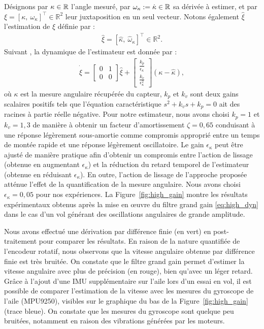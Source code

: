 Désignons par $\kappa \in {\mathbb R}$ l'angle mesuré, par $\omega_{\kappa} := \dot \kappa  \in {\mathbb R}$ sa dérivée à estimer, et par $\xi = [\kappa,~\omega_{\kappa}]^\top \in \mathbb{R}^2$ leur juxtaposition en un seul vecteur. Notons également $\hat{\xi}$ l'estimation de $\xi$ définie par :
\begin{align*}
    \hat{\xi} = [\hat{\kappa},~\hat{\omega}_{\kappa}]^\top \in \mathbb{R}^2.
\end{align*}
Suivant \cite{203613}, la dynamique de l'estimateur est donnée par :
\begin{align}
\label{eq:high_dyn}
    \dot{\hat{\xi}} =  \begin{bmatrix}0 & 1 \\ 0 & 0 \end{bmatrix} \hat{\xi}+ \begin{bmatrix}\frac{k_{p}}{\epsilon_{\kappa}}  \\ \frac{k_{v}}{\epsilon_{\kappa}^{2}}  \end{bmatrix} (\kappa - \hat{\kappa}),
\end{align}
où $\kappa$ est la mesure angulaire récupérée du capteur, $k_{p}$ et $k_{v}$ sont deux gains scalaires positifs tels que l'équation caractéristique $s^{2} + k_{v} s + k_{p} = 0$ ait des racines à partie réelle négative. Pour notre estimateur, nous avons choisi $k_{p} = 1$ et $k_{v} = 1,3$ de manière à obtenir un facteur d'amortissement $\zeta = 0,65$ conduisant à une réponse légèrement sous-amortie comme compromis approprié entre un temps de montée rapide et une réponse légèrement oscillatoire. Le gain $\epsilon_{\kappa}$ peut être ajusté de manière pratique afin d'obtenir un compromis entre l'action de lissage (obtenue en augmentant $\epsilon_{\kappa}$) et la réduction du retard temporel
de l'estimateur (obtenue en réduisant $\epsilon_{\kappa}$). En outre, l'action de lissage de l'approche proposée atténue l'effet de la quantification de la mesure angulaire. Nous avons choisi $\epsilon_{\kappa} = 0,05$ pour nos expériences. La Figure~\ref{fig:high_gain} montre les résultats expérimentaux obtenus après la mise en œuvre du filtre grand gain \eqref{eq:high_dyn} dans le cas d'un vol générant des oscillations angulaires de grande amplitude.

Nous avons effectué une dérivation par différence finie (en vert) en post-traitement pour comparer les résultats. En raison de la nature quantifiée de l'encodeur rotatif, nous observons que la vitesse angulaire obtenue par différence finie est très bruitée. On constate que le filtre grand gain permet d'estimer la vitesse angulaire avec plus de précision (en rouge), bien qu'avec un léger retard. Grâce à l'ajout d'une IMU supplémentaire sur l'aile lors d'un essai en vol, il est possible de comparer l'estimation de la vitesse avec les mesures du gyroscope de l'aile (MPU9250), visibles sur le graphique du bas de la Figure~\ref{fig:high_gain} (trace bleue). On constate que les mesures du gyroscope sont quelque peu bruitées, notamment en raison des vibrations générées par les moteurs. 

